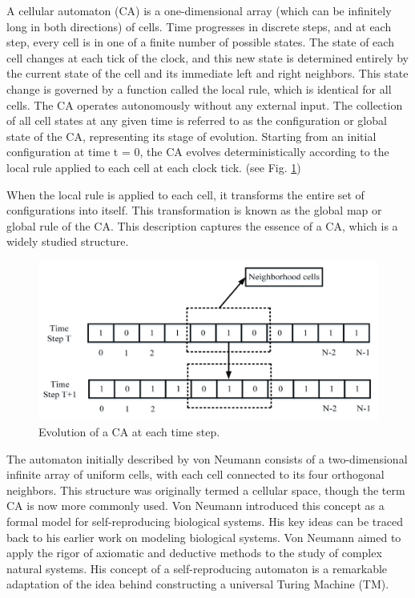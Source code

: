 \documentclass[9pt,a4paper,twoside]{tau-class/tau}
\begin{document}
    A cellular automaton (CA) is a one-dimensional array (which can be infinitely long in both directions) of cells. 
    Time progresses in discrete steps, and at each step, every cell is in one of a finite number of possible states. The state of each cell changes at each tick of the clock, and this new state is determined entirely by the current state of the cell and its immediate left and right neighbors. 
    This state change is governed by a function called the local rule, which is identical for all cells. 
    The CA operates autonomously without any external input. 
    The collection of all cell states at any given time is referred to as the configuration or global state of the CA, 
    representing its stage of evolution. Starting from an initial configuration at time t = 0, the CA evolves deterministically according to the local 
    rule applied to each cell at each clock tick. (see Fig. \ref{fig:timeStep})

    When the local rule is applied to each cell, it transforms the entire set of configurations into itself. 
    This transformation is known as the global map or global rule of the CA. This description captures the essence of a CA, which is a widely studied structure.
    \begin{figure}[H]
        \centering
        \includegraphics[width=0.75\columnwidth]{figures/timestep.png}
        \caption{Evolution of a CA at each time step. \cite{math11102322}}
        \label{fig:timeStep}
    \end{figure}

    The automaton initially described by von Neumann\cite{von-neumann-automata} consists of a two-dimensional infinite array of uniform cells, with each cell connected to its four orthogonal neighbors. 
    This structure was originally termed a cellular space, though the term CA is now more commonly used. Von Neumann introduced this concept as a formal model for self-reproducing biological systems. His key ideas can be traced back to his earlier work on modeling biological systems. 
    Von Neumann aimed to apply the rigor of axiomatic and deductive methods to the study of complex natural systems. His concept of a self-reproducing automaton is a remarkable adaptation of the idea behind constructing a universal Turing Machine (TM).
\end{document}
